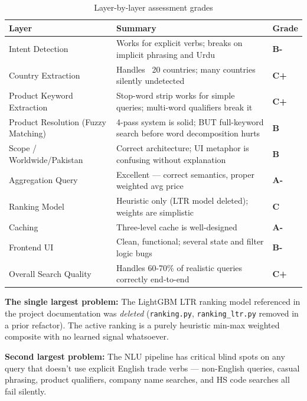 \documentclass[12pt,a4paper]{article}
\newcommand{\cellOK}[1]{\cellcolor{okBg}\textcolor{zaraiGreen}{\textbf{#1}}}
\newcommand{\cellWarn}[1]{\cellcolor{warningBg}\textcolor{zaraiAmber}{\textbf{#1}}}
\newcommand{\cellBad}[1]{\cellcolor{errorBg}\textcolor{zaraiRed}{\textbf{#1}}}
\begin{document}
\begin{table}[H]
\centering
\renewcommand{\arraystretch}{1.4}
\begin{tabularx}{\textwidth}{lXl}
\toprule
\textbf{Layer} & \textbf{Summary} & \textbf{Grade} \\
\midrule
Intent Detection & Works for explicit verbs; breaks on implicit phrasing and Urdu &\cellWarn{B-} \\
Country Extraction & Handles ~20 countries; many countries silently undetected &\cellWarn{C+} \\
Product Keyword Extraction & Stop-word strip works for simple queries; multi-word qualifiers break it &\cellWarn{C+} \\
Product Resolution (Fuzzy Matching) & 4-pass system is solid; BUT full-keyword search before word decomposition hurts &\cellWarn{B} \\
Scope / Worldwide/Pakistan & Correct architecture; UI metaphor is confusing without explanation &\cellWarn{B} \\
Aggregation Query & Excellent --- correct semantics, proper weighted avg price &\cellOK{A-} \\
Ranking Model & Heuristic only (LTR model deleted); weights are simplistic &\cellBad{C} \\
Caching & Three-level cache is well-designed &\cellOK{A-} \\
Frontend UI & Clean, functional; several state and filter logic bugs &\cellWarn{B-} \\
Overall Search Quality & Handles 60-70\% of realistic queries correctly end-to-end &\cellWarn{C+} \\
\bottomrule
\end{tabularx}
\caption{Layer-by-layer assessment grades}
\end{table}

\textbf{The single largest problem:} The LightGBM LTR ranking model referenced in the
project documentation was \textit{deleted} (\texttt{ranking.py}, \texttt{ranking\_ltr.py}
removed in a prior refactor). The active ranking is a purely heuristic min-max weighted
composite with no learned signal whatsoever.

\textbf{Second largest problem:} The NLU pipeline has critical blind spots on any query
that doesn't use explicit English trade verbs --- non-English queries, casual phrasing,
product qualifiers, company name searches, and HS code searches all fail silently.

\end{document}

